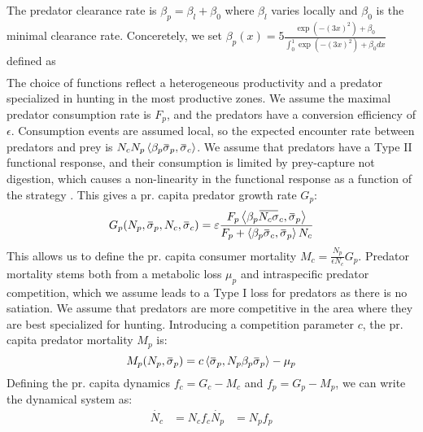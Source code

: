 The predator clearance rate is $\beta_p = \beta_{l} + \beta_0$ where $\beta_l$ varies locally and $\beta_0$ is the minimal clearance rate. Conceretely, we set $\beta_p(x) = 5 \frac{\exp(-(3 x)^2) + \beta_0}{\int_0^1 \exp(-(3 x)^2) + \beta_0 dx}$
 defined as
\begin{align}
\end{align}
The choice of functions reflect a heterogeneous productivity and a predator specialized in hunting in the most productive zones. We assume the maximal predator consumption rate is $F_p$, and the predators have a conversion efficiency of $\epsilon$. Consumption events are assumed local, so the expected encounter rate between predators and prey is $N_c N_p \ip{\beta_p \overbar{\sigma}_p}{\overbar{\sigma}_c}$. We assume that predators have a Type II functional response, and their consumption is limited by prey-capture not digestion, which causes a non-linearity in the functional response as a function of the strategy \citep{Kioerboe2018}. This gives a pr. capita predator growth rate $G_p$:
\begin{equation}
  G_p(N_p, \overbar{\sigma}_p, N_c, \overbar{\sigma}_c )= \epsilon\frac{F_p \ip{\beta_p \overbar{N_c \sigma}_c}{\overbar{\sigma}_p} }{F_p + \ip{\beta_p \overbar{\sigma}_c}{\overbar{\sigma}_p} N_c}
\end{equation}
This allows us to define the pr. capita consumer mortality $M_c = \frac{N_p}{\epsilon N_c}G_p$. Predator mortality stems both from a metabolic loss $\mu_p$ and intraspecific predator competition, which we assume leads to a Type I loss for predators as there is no satiation. We assume that predators are more competitive in the area where they are best specialized for hunting. Introducing a competition parameter $c$, the pr. capita predator mortality $M_p$ is:
\begin{equation}
  M_p(N_p, \overbar{\sigma}_p) =  c \ip{\overbar{\sigma}_p}{N_p\beta_p \overbar{\sigma}_p}  - \mu_p
\end{equation}
Defining the pr. capita dynamics $f_c = G_c - M_c$ and $f_p = G_p - M_p$, we can write the dynamical system as:
\begin{align}
  \dot{N_c} &= N_c f_c
  \dot{N_p} &= N_p f_p
  \label{eq:dynamics}
\end{align}

